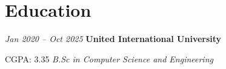 \section{Education}

    \begin{twocolentry}{
        \textit{Jan 2020 – Oct 2025}}
        \textbf{United International University}
    \end{twocolentry}

    \begin{twocolentry}{CGPA: 3.35}
        \textit{B.Sc in Computer Science and Engineering}
    \end{twocolentry}

